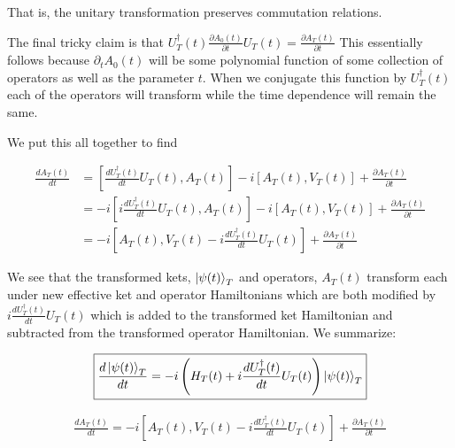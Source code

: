 \documentclass[12pt]{article}
\newcommand{\ddt}[1]{\frac{d #1}{dt}}
\begin{document}
That is, the unitary transformation preserves commutation relations.

The final tricky claim is that $U_T^{\dag}(t) \frac{\partial A_0(t)}{\partial t} U_T(t) = \frac{\partial A_T(t)}{\partial t}$ This essentially follows because $\partial_t A_0(t)$ will be some polynomial function of some collection of operators as well as the parameter $t$. When we conjugate this function by $U_T^{\dag}(t)$ each of the operators will transform while the time dependence will remain the same.

We put this all together to find

\begin{align}
\ddt{A_T(t)} &= \left[\ddt{U_T^{\dag}(t)}U_T(t),A_T(t) \right] -i [A_T(t),V_T(t)] + \frac{\partial A_T(t)}{\partial t}\\
&= -i  \left[i\ddt{U_T^{\dag}(t)}U_T(t),A_T(t) \right] -i [A_T(t),V_T(t)] + \frac{\partial A_T(t)}{\partial t}\\
&= -i \left[A_T(t), V_T(t) - i \ddt{U_T^{\dag}(t)}U_T(t)\right] + \frac{\partial A_T(t)}{\partial t}
\end{align}

We see that the transformed kets, $\ket{\psi(t)}_T$ and operators, $A_T(t)$ transform each under new effective ket and operator Hamiltonians which are both modified by $i\ddt{U_T^{\dag}(t)}U_T(t)$ which is added to the transformed ket Hamiltonian and subtracted from the transformed operator Hamiltonian. We summarize:

\begin{align}
\boxed{\ddt{\ket{\psi(t)}_T} = -i \left(H_T(t) + i\ddt{U_T^{\dag}(t)}U_T(t) \right) \ket{\psi(t)}_T}
\end{align}

\begin{align}
\boxed{
	\ddt{A_T(t)} = -i\left[A_T(t), V_T(t) -i\ddt{U_T^{\dag}(t)}U_T(t) \right] + \frac{\partial A_T(t)}{\partial t}
}
\end{align}
\end{document}
